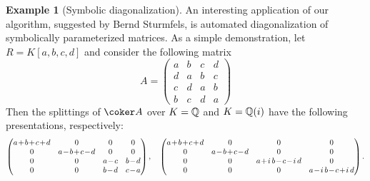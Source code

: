 \documentclass[12pt]{article}
\theoremstyle{theorem}
\numberwithin{thm}{section}
\theoremstyle{definition}
\newtheorem{exa}[thm]{Example}
\newcommand{\mahrud}[1]{{\color{ForestGreen} \sf $\blacklozenge$ Mahrud: [#1]}}
\begin{document}
\begin{exa}[Symbolic diagonalization]\label{example:QQ}
  An interesting application of our algorithm, suggested by Bernd Sturmfels,  is automated diagonalization of symbolically parameterized matrices. As a simple demonstration, let $R = K[a,b,c,d]$ and consider the following matrix
  \[ A = \begin{pmatrix}
    a&b&c&d\\
    d&a&b&c\\
    c&d&a&b\\
    b&c&d&a
  \end{pmatrix} \]
  Then the splittings of $\coker A$ over $K = \mathbb Q$ and $K = \mathbb Q(i)$ have the following presentations, respectively:
  \[\medmuskip1.5mu \begin{pmatrix}
    a+b+c+d&0&0&0\\
    0&a-b+c-d&0&0\\
    0&0&a-c&b-d\\
    0&0&b-d&c-a
  \end{pmatrix},
  \quad
  \begin{pmatrix}
    a+b+c+d&0&0&0\\
    0&a-b+c-d&0&0\\
    0&0&a+i\,b-c-i\,d&0\\
    0&0&0&a-i\,b-c+i\,d
  \end{pmatrix}.
  \]
\end{exa}





\end{document}
